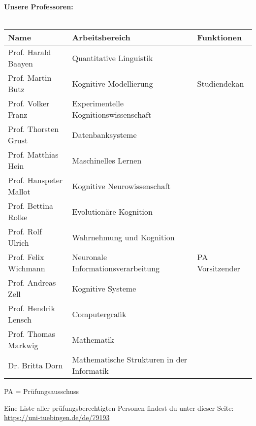 \renewcommand{\arraystretch}{1}
\normalsize 
\textbf{Unsere Professoren:}\\\\
\footnotesize

\begin{tabular}{|p{}p{}p{}|}
\hline
Name                          & Arbeitsbereich & Funktionen \\
\hline
\hline
Prof. Harald Baayen			& Quantitative Linguistik 				& \\
Prof. Martin Butz           & Kognitive Modellierung 				& Studiendekan	\\
Prof. Volker Franz			& Experimentelle Kognitionswissenschaft	& \\
Prof. Thorsten Grust		& Datenbanksysteme & \\
Prof. Matthias Hein			& Maschinelles Lernen & \\
Prof. Hanspeter Mallot 		& Kognitive Neurowissenschaft	& \\
Prof. Bettina Rolke			& Evolutionäre Kognition	& \\
Prof. Rolf Ulrich			& Wahrnehmung und Kognition	& \\
Prof. Felix Wichmann        & Neuronale Informationsverarbeitung	& PA Vorsitzender\\
Prof. Andreas Zell          & Kognitive Systeme 		 &\\
Prof. Hendrik Lensch & Computergrafik &\\
Prof. Thomas Markwig & Mathematik &\\
Dr. Britta Dorn & Mathematische Strukturen in der Informatik &\\
\hline
\end{tabular}

\scriptsize{PA = Prüfungsausschuss}

Eine Liste aller prüfungsberechtigten Personen findest du unter dieser Seite: \url{https://uni-tuebingen.de/de/79193}

